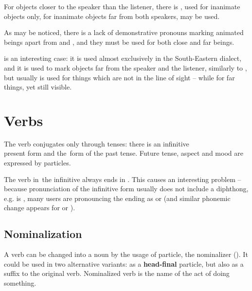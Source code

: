 For objects closer to the speaker than the listener, there is , used
for inanimate objects only, for inanimate objects far from both speakers,
 may be used.

As may be noticed, there is a lack of demonstrative pronouns marking animated
beings apart from  and , and they must be used for both
close and far beings.


 is an interesting case: it is used almost exclusively in the
South-Eastern dialect, and it is used to mark objects far from the speaker and
the listener, similarly to , but usually is used for things which
are not in the line of sight -- while  for far things, yet still
visible.

\section{Verbs}
\label{sec:morph-verbs}

The verb conjugates only through tenses: there is an infinitive\\present form and
the~form of the past tense. Future tense, aspect and mood are expressed by
particles.

The verb in~the infinitive always ends in . This causes an interesting
problem -- because pronunciation of the infinitive form usually does not include
a diphthong, e.g.  is , many users are
pronouncing the ending  as  or  (and similar phonemic
change appears for  or ).



\subsection{Nominalization}

A verb can be changed into a noun by the usage of  particle, the
nominalizer (\Nmlz{}). It could be used in two alternative variants: as a
\textbf{head-final} particle, but also as a suffix to the original verb.
Nominalized verb is the name of the act of doing something.

